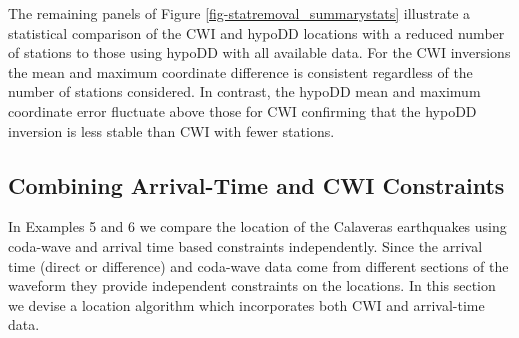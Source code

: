 \documentclass[12pt,double]{article}
\begin{document}
The remaining panels of Figure \ref{fig-statremoval_summarystats}
illustrate a statistical comparison of the CWI and hypoDD locations 
with a reduced number of stations to those using hypoDD with all available data. For
the CWI inversions the mean and maximum coordinate difference is
consistent regardless of the number of stations considered. In
contrast, the hypoDD mean and maximum coordinate error fluctuate
above those for CWI confirming that the hypoDD inversion is less
stable than CWI with fewer stations.

\vspace{2em}
\begin{centering}
\section*{Combining Arrival-Time and CWI Constraints}
\end{centering}
\label{sec:CalaverasLoc-CWIandTT}
In Examples 5 and 6 we compare the location of the Calaveras
earthquakes using coda-wave and arrival time based constraints
independently. Since the arrival time (direct or difference) and
coda-wave data
 come from different sections of the waveform they provide independent constraints on the locations.
 In this section we devise a location algorithm which incorporates
 both CWI and arrival-time data.
\end{document}
